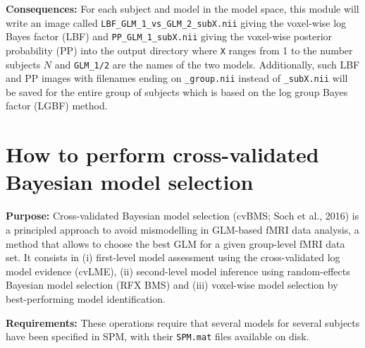 \documentclass[a4paper,12pt]{article}
\begin{document}
\textbf{Consequences:} For each subject and model in the model space, this module will write an image called \texttt{LBF\_GLM\_1\_vs\_GLM\_2\_subX.nii} giving the voxel-wise log Bayes factor (LBF) and \texttt{PP\_GLM\_1\_subX.nii} giving the voxel-wise posterior probability (PP) into the output directory where \texttt{X} ranges from 1 to the number subjects $N$ and \texttt{GLM\_1/2} are the names of the two models. Additionally, such LBF and PP images with filenames ending on \texttt{\_group.nii} instead of \texttt{\_subX.nii} will be saved for the entire group of subjects which is based on the log group Bayes factor (LGBF) method.



\pagebreak
\section[How to perform cross-validated Bayesian model selection]{How to perform cross-validated \\ Bayesian model selection} \label{sec:cvBMS}

\textbf{Purpose:} Cross-validated Bayesian model selection (cvBMS; Soch et al., 2016) is a principled approach to avoid mismodelling in GLM-based fMRI data analysis, a method that allows to choose the best GLM for a given group-level fMRI data set. It consists in (i) first-level model assessment using the cross-validated log model evidence (cvLME), (ii) second-level model inference using random-effects Bayesian model selection (RFX BMS) and (iii) voxel-wise model selection by best-performing model identification.

\textbf{Requirements:} These operations require that several models for several subjects have been specified in SPM, with their \texttt{SPM.mat} files available on disk.
\end{document}
